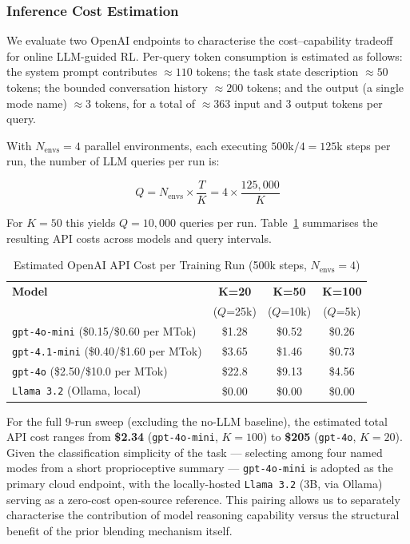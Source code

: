 \documentclass[letterpaper, 10 pt, conference]{IEEEtran}
\begin{document}
\subsubsection{Inference Cost Estimation}
We evaluate two OpenAI endpoints to characterise the cost--capability tradeoff
for online LLM-guided RL. Per-query token consumption is estimated as follows:
the system prompt contributes $\approx 110$ tokens; the task state description
$\approx 50$ tokens; the bounded conversation history $\approx 200$ tokens;
and the output (a single mode name) $\approx 3$ tokens, for a total of
$\approx 363$ input and $3$ output tokens per query.

With $N_{\text{envs}} = 4$ parallel environments, each executing
$500\text{k} / 4 = 125\text{k}$ steps per run, the number of LLM queries per
run is:

\begin{equation}
    Q = N_{\text{envs}} \times \frac{T}{K} = 4 \times \frac{125{,}000}{K}
\end{equation}

For $K = 50$ this yields $Q = 10{,}000$ queries per run. Table~\ref{tab:llm_cost}
summarises the resulting API costs across models and query intervals.

\begin{table}[h]
\centering
\caption{Estimated OpenAI API Cost per Training Run (500k steps, $N_{\text{envs}}=4$)}
\label{tab:llm_cost}
\begin{tabular}{@{}lccc@{}}
\toprule
\textbf{Model} &
\textbf{K=20} &
\textbf{K=50} &
\textbf{K=100} \\
& ($Q$=25k) & ($Q$=10k) & ($Q$=5k) \\ \midrule
\texttt{gpt-4o-mini} (\$0.15/\$0.60 per MTok) & \$1.28 & \$0.52 & \$0.26 \\
\texttt{gpt-4.1-mini} (\$0.40/\$1.60 per MTok) & \$3.65 & \$1.46 & \$0.73 \\
\texttt{gpt-4o}       (\$2.50/\$10.0 per MTok) & \$22.8 & \$9.13 & \$4.56 \\
\texttt{Llama 3.2} (Ollama, local)             & \$0.00 & \$0.00 & \$0.00 \\ \bottomrule
\end{tabular}
\end{table}

For the full 9-run sweep (excluding the no-LLM baseline), the estimated total
API cost ranges from \textbf{\$2.34} (\texttt{gpt-4o-mini}, $K=100$) to
\textbf{\$205} (\texttt{gpt-4o}, $K=20$). Given the classification
simplicity of the task — selecting among four named modes from a short
proprioceptive summary — \texttt{gpt-4o-mini} is adopted as the primary
cloud endpoint, with the locally-hosted \texttt{Llama 3.2} (3B, via Ollama)
serving as a zero-cost open-source reference. This pairing allows us to
separately characterise the contribution of model reasoning capability
versus the structural benefit of the prior blending mechanism itself.
\end{document}
